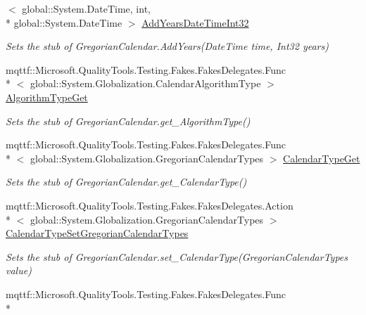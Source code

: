\begin{DoxyCompactItemize}
$<$ global\-::\-System.\-Date\-Time, int, \\*
global\-::\-System.\-Date\-Time $>$ \hyperlink{class_system_1_1_globalization_1_1_fakes_1_1_stub_gregorian_calendar_a65de622dccc17f2f04803da2ebcbff7f}{Add\-Years\-Date\-Time\-Int32}
\begin{DoxyCompactList}\small\item\em Sets the stub of Gregorian\-Calendar.\-Add\-Years(\-Date\-Time time, Int32 years)\end{DoxyCompactList}\item 
mqttf\-::\-Microsoft.\-Quality\-Tools.\-Testing.\-Fakes.\-Fakes\-Delegates.\-Func\\*
$<$ global\-::\-System.\-Globalization.\-Calendar\-Algorithm\-Type $>$ \hyperlink{class_system_1_1_globalization_1_1_fakes_1_1_stub_gregorian_calendar_a813b46ee03ea0868172da7127f409934}{Algorithm\-Type\-Get}
\begin{DoxyCompactList}\small\item\em Sets the stub of Gregorian\-Calendar.\-get\-\_\-\-Algorithm\-Type()\end{DoxyCompactList}\item 
mqttf\-::\-Microsoft.\-Quality\-Tools.\-Testing.\-Fakes.\-Fakes\-Delegates.\-Func\\*
$<$ global\-::\-System.\-Globalization.\-Gregorian\-Calendar\-Types $>$ \hyperlink{class_system_1_1_globalization_1_1_fakes_1_1_stub_gregorian_calendar_aa6d4802a173ce3b4cde185c28da0374f}{Calendar\-Type\-Get}
\begin{DoxyCompactList}\small\item\em Sets the stub of Gregorian\-Calendar.\-get\-\_\-\-Calendar\-Type()\end{DoxyCompactList}\item 
mqttf\-::\-Microsoft.\-Quality\-Tools.\-Testing.\-Fakes.\-Fakes\-Delegates.\-Action\\*
$<$ global\-::\-System.\-Globalization.\-Gregorian\-Calendar\-Types $>$ \hyperlink{class_system_1_1_globalization_1_1_fakes_1_1_stub_gregorian_calendar_a6655ccf832a8c1e6127d7d0c946b9ca4}{Calendar\-Type\-Set\-Gregorian\-Calendar\-Types}
\begin{DoxyCompactList}\small\item\em Sets the stub of Gregorian\-Calendar.\-set\-\_\-\-Calendar\-Type(\-Gregorian\-Calendar\-Types value)\end{DoxyCompactList}\item 
mqttf\-::\-Microsoft.\-Quality\-Tools.\-Testing.\-Fakes.\-Fakes\-Delegates.\-Func\\*

\end{DoxyCompactItemize}
